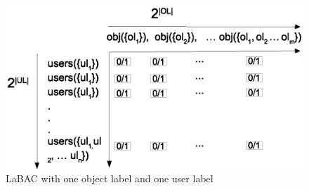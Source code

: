  	\begin{figure} 
 		\centering
 		\includegraphics[width=.4\textwidth]{policyspace-labace}
 		\caption{LaBAC with one object label and one user label}
 		\label{fig:policyspace-labace}
 	\end{figure}